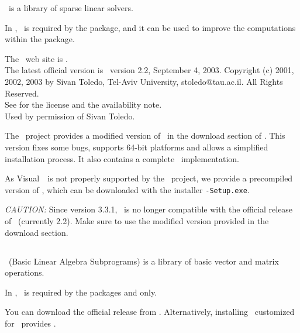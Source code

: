 \taucs\ is a library of sparse linear solvers.

In \cgal, \taucs\ is required by the 
package, and it can be
used to improve the computations within the
package.

The \taucs\ web site is \taucspage.\\
The latest official version is \taucs\ version 2.2, September 4, 2003.
Copyright (c) 2001, 2002, 2003 by Sivan Toledo, Tel-Aviv University,
stoledo@tau.ac.il. All Rights Reserved.\\
See \taucspage{} for the license and the availability note.\\
Used by permission of Sivan Toledo.

The \cgal\ project provides a modified version of \taucs\ in the download
section of \cgalhomepage. This version fixes some bugs,
supports 64-bit platforms and allows a simplified installation process.
It also contains a complete \lapack\ implementation.

As Visual~\CC\ is not properly
supported by the \taucs\ project, we provide a precompiled version of
\taucs, which can be downloaded with the installer
\texttt{\cgalrel-Setup.exe}.

{\em CAUTION:} Since version 3.3.1, \cgal\ is no longer compatible with the official
release of \taucs\ (currently 2.2). Make sure to use the modified
version provided in the download section.

\subsection{\blas \label{thirdparty:Blas}}

\blas\ (Basic Linear Algebra Subprograms) is a library of
basic vector and matrix operations.

In \cgal, \blas\ is required by the packages
and  only.

You can download the official release from \blaspage.
Alternatively, installing \taucs\ customized for \cgal\ provides \blas.

\subsection{\lapack \label{thirdparty:Lapack}}

